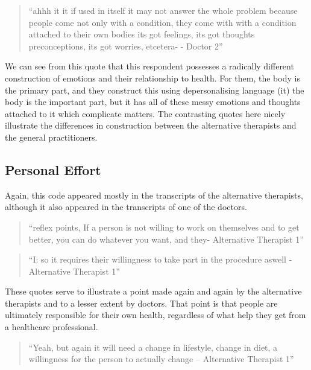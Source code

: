 \begin{quotation}
``ahhh it it if used in itself it may not answer the whole problem because people come not only with a condition, they come with with a condition attached to their own bodies its got feelings, its got thoughts preconceptions, its got worries, etcetera- - Doctor 2''  
\end{quotation}


We can see from this quote that this respondent possesses a radically different construction of emotions and their relationship to health. For them, the body is the primary part, and they construct this using depersonalising language (it) the body is the important part, but it has all of these messy emotions and thoughts attached to it which complicate matters. The contrasting quotes here nicely illustrate the differences in construction between the alternative therapists and the general practitioners. 


\subsection{Personal Effort}

Again, this code appeared mostly in the transcripts of the alternative therapists, although it also appeared in the transcripts of one of the doctors. 

\begin{quotation}
``reflex points, If a person is not willing to work on themselves and to get better, you can do whatever you want, and they- Alternative Therapist 1''  
\end{quotation}

\begin{quotation}
``I: so it requires their willingness to take part in the procedure aswell - Alternative Therapist 1''  
\end{quotation}


These quotes serve to illustrate a point made again and again by the alternative therapists and to a lesser extent by doctors. That point is that people are ultimately responsible for their own health, regardless of what help they get from a healthcare professional. 

\begin{quotation}
``Yeah, but again it will need a change in lifestyle, change in diet, a willingness for the person to actually change – Alternative Therapist 1''
  
\end{quotation}

